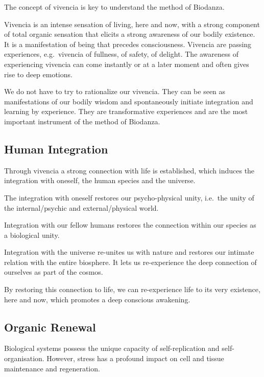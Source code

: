 \documentclass[
  11pt,
]{book}
\begin{document}
The concept of vivencia is key to understand the method of Biodanza.

Vivencia is an intense sensation of living, here and now, with a strong component of total organic sensation that elicits a strong awareness of our bodily existence. It is a manifestation of being that precedes consciousness.
Vivencia are passing experiences, e.g.~vivencia of fullness, of safety, of delight.
The awareness of experiencing vivencia can come instantly or at a later moment and often gives rise to deep emotions.

We do not have to try to rationalize our vivencia.
They can be seen as manifestations of our bodily wisdom and spontaneously initiate integration and learning by experience.
They are transformative experiences and are the most important instrument of the method of Biodanza.

\hypertarget{human-integration}{%
\subsection{Human Integration}\label{human-integration}}

Through vivencia a strong connection with life is established, which induces the integration with oneself, the human species and the universe.

The integration with oneself restores our psycho-physical unity, i.e.~the unity of the internal/psychic and external/physical world.

Integration with our fellow humans restores the connection within our species as a biological unity.

Integration with the universe re-unites us with nature and restores our intimate relation with the entire biosphere.
It lets us re-experience the deep connection of ourselves as part of the cosmos.

By restoring this connection to life, we can re-experience life to its very existence, here and now, which promotes a deep conscious awakening.

\hypertarget{organic-renewal}{%
\subsection{Organic Renewal}\label{organic-renewal}}

Biological systems possess the unique capacity of self-replication and self-organisation. However, stress has a profound impact on cell and tissue maintenance and regeneration.
\end{document}
